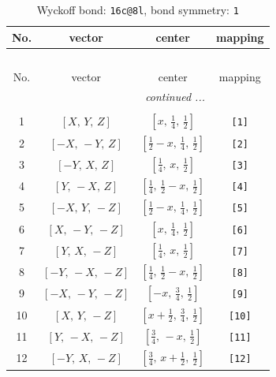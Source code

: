 \documentclass[fleqn,8pt]{jsarticle}
\begin{document}
\begin{longtable}{cccc}
\caption{Wyckoff bond: {\tt 16c@8l}, bond symmetry: {\tt 1}}
 \\
 \hline \hline
No. & vector & center & mapping \\ \hline \endfirsthead

\multicolumn{3}{l}{\tablename\ \thetable{}} \\
 \hline \hline
No. & vector & center & mapping \\ \hline \endhead

 \hline \hline
\multicolumn{3}{r}{\footnotesize\it continued ...} \\ \endfoot

 \hline \hline
\multicolumn{3}{r}{} \\ \endlastfoot

1 & $\left[ X,\, Y,\, Z \right]$ & $\left[ x,\, \frac{1}{4},\, \frac{1}{2} \right]$ & {\tt [1]} \\ \hline
2 & $\left[ - X,\, - Y,\, Z \right]$ & $\left[ \frac{1}{2} - x,\, \frac{1}{4},\, \frac{1}{2} \right]$ & {\tt [2]} \\ \hline
3 & $\left[ - Y,\, X,\, Z \right]$ & $\left[ \frac{1}{4},\, x,\, \frac{1}{2} \right]$ & {\tt [3]} \\ \hline
4 & $\left[ Y,\, - X,\, Z \right]$ & $\left[ \frac{1}{4},\, \frac{1}{2} - x,\, \frac{1}{2} \right]$ & {\tt [4]} \\ \hline
5 & $\left[ - X,\, Y,\, - Z \right]$ & $\left[ \frac{1}{2} - x,\, \frac{1}{4},\, \frac{1}{2} \right]$ & {\tt [5]} \\ \hline
6 & $\left[ X,\, - Y,\, - Z \right]$ & $\left[ x,\, \frac{1}{4},\, \frac{1}{2} \right]$ & {\tt [6]} \\ \hline
7 & $\left[ Y,\, X,\, - Z \right]$ & $\left[ \frac{1}{4},\, x,\, \frac{1}{2} \right]$ & {\tt [7]} \\ \hline
8 & $\left[ - Y,\, - X,\, - Z \right]$ & $\left[ \frac{1}{4},\, \frac{1}{2} - x,\, \frac{1}{2} \right]$ & {\tt [8]} \\ \hline
9 & $\left[ - X,\, - Y,\, - Z \right]$ & $\left[ - x,\, \frac{3}{4},\, \frac{1}{2} \right]$ & {\tt [9]} \\ \hline
10 & $\left[ X,\, Y,\, - Z \right]$ & $\left[ x + \frac{1}{2},\, \frac{3}{4},\, \frac{1}{2} \right]$ & {\tt [10]} \\ \hline
11 & $\left[ Y,\, - X,\, - Z \right]$ & $\left[ \frac{3}{4},\, - x,\, \frac{1}{2} \right]$ & {\tt [11]} \\ \hline
12 & $\left[ - Y,\, X,\, - Z \right]$ & $\left[ \frac{3}{4},\, x + \frac{1}{2},\, \frac{1}{2} \right]$ & {\tt [12]} \\ \hline

\end{longtable}
\end{document}
